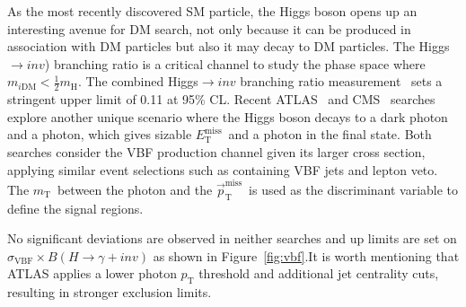 \documentclass{moriond}
\def\mt{m_{\mathrm{T}}}
\def\et{E_\mathrm{T}^{\mathrm{miss}}}
\def\ptmiss{\vec{p}_\mathrm{T}^{\mathrm{miss}}}
\begin{document}
As the most recently discovered SM particle, the Higgs boson opens up an
interesting avenue for DM search, not only because it can be produced in
association with DM particles but also it may decay to DM particles. The
Higgs$\rightarrow inv$) branching ratio is a critical channel to study the
phase space where $m_{i\mathrm{DM}} < \frac{1}{2}m_{\mathrm{H}}$. The combined
Higgs$\rightarrow inv$ branching ratio measurement~\cite{hiv} sets a stringent
upper limit of 0.11 at 95\% CL. Recent ATLAS~\cite{atlasvbf} and
CMS~\cite{cmsvbf} searches explore another unique scenario where the Higgs boson
decays to a dark photon and a photon, which gives sizable $\et$\ and a photon
in the final state. Both searches consider the VBF production channel given its
larger cross section, applying similar event selections such as containing VBF
jets and lepton veto. The $\mt$\ between the photon and the $\ptmiss$\ is used
as the discriminant variable to define the signal regions. 

No significant deviations are observed in neither searches and up limits are set on $\sigma_{\mathrm{VBF}}\times B(H\rightarrow\gamma+inv)$ as shown in Figure~\ref{fig:vbf}.It is worth mentioning that ATLAS applies a lower photon $p_{\mathrm{T}}$ threshold and
additional jet centrality cuts, resulting in stronger exclusion limits.  
\end{document}
